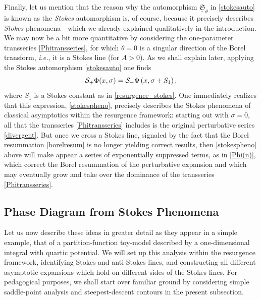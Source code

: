 \documentclass[11pt,a4paper]{article}
\newcommand{\CS}{{\cal S}}
\newcommand{\be}{\begin{equation}}
\newcommand{\ee}{\end{equation}}
\begin{document}
Finally, let us mention that the reason why the automorphism $\underline{\mathfrak{S}}_\theta$ in \eqref{stokesauto} is known as the \textit{Stokes} automorphism is, of course, because it precisely describes \textit{Stokes} phenomena---which we already explained qualitatively in the introduction. We may now be a bit more quantitative by considering the one-parameter transseries \eqref{Phitransseries}, for which $\theta=0$ is a singular direction of the Borel transform, \textit{i.e.}, it is a Stokes line (for $A>0$). As we shall explain later, applying the Stokes automorphism \eqref{stokesauto} one finds
%
\be\label{stokespheno}
\CS_{+} \Phi (x,\sigma) = \CS_{-} \Phi \left( x, \sigma + S_1 \right),
\ee
%
\noindent
where $S_1$ is a Stokes constant as in \eqref{resurgence_stokes}. One immediately realizes that this expression, \eqref{stokespheno}, precisely describes the Stokes phenomena of classical asymptotics within the resurgence framework: starting out with $\sigma = 0$, all that the transseries \eqref{Phitransseries} includes is the original perturbative series \eqref{divergent}. But once we cross a Stokes line, signaled by the fact that the Borel resummation \eqref{borelresum} is no longer yielding correct  results, then \eqref{stokespheno} above will make appear a series of exponentially suppressed terms, as in \eqref{Phi(n)}, which correct the Borel resummation of the perturbative expansion and which may eventually grow and take over the dominance of the transseries \eqref{Phitransseries}.

\subsection{Phase Diagram from Stokes Phenomena}\label{subsec:4intphases}

Let us now describe these ideas in greater detail as they appear in a simple example, that of a partition-function toy-model described by a one-dimensional integral with quartic potential. We will set up this analysis within the resurgence framework, identifying Stokes and anti-Stokes lines, and constructing all different asymptotic expansions which hold on different sides of the Stokes lines. For pedagogical purposes, we shall start over familiar ground by considering simple saddle-point analysis and steepest-descent contours in the present subsection.
\end{document}
